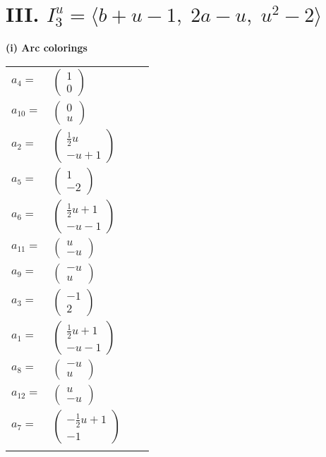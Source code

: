 \documentclass[1p]{elsarticle_modified}
\theoremstyle{definition}
\begin{document}
\centering \section*{III. $I^u_{3}= \langle b+u-1,\;2 a- u,\;u^2-2 \rangle$}
\flushleft \textbf{(i) Arc colorings}\\
\begin{tabular}{m{7pt} m{180pt} m{7pt} m{180pt} }
\flushright $a_{4}=$&$\begin{pmatrix}1\\0\end{pmatrix}$ \\
\flushright $a_{10}=$&$\begin{pmatrix}0\\u\end{pmatrix}$ \\
\flushright $a_{2}=$&$\begin{pmatrix}\frac{1}{2} u\\- u+1\end{pmatrix}$ \\
\flushright $a_{5}=$&$\begin{pmatrix}1\\-2\end{pmatrix}$ \\
\flushright $a_{6}=$&$\begin{pmatrix}\frac{1}{2} u+1\\- u-1\end{pmatrix}$ \\
\flushright $a_{11}=$&$\begin{pmatrix}u\\- u\end{pmatrix}$ \\
\flushright $a_{9}=$&$\begin{pmatrix}- u\\u\end{pmatrix}$ \\
\flushright $a_{3}=$&$\begin{pmatrix}-1\\2\end{pmatrix}$ \\
\flushright $a_{1}=$&$\begin{pmatrix}\frac{1}{2} u+1\\- u-1\end{pmatrix}$ \\
\flushright $a_{8}=$&$\begin{pmatrix}- u\\u\end{pmatrix}$ \\
\flushright $a_{12}=$&$\begin{pmatrix}u\\- u\end{pmatrix}$ \\
\flushright $a_{7}=$&$\begin{pmatrix}-\frac{1}{2} u+1\\-1\end{pmatrix}$\\&\end{tabular}
\end{document}
